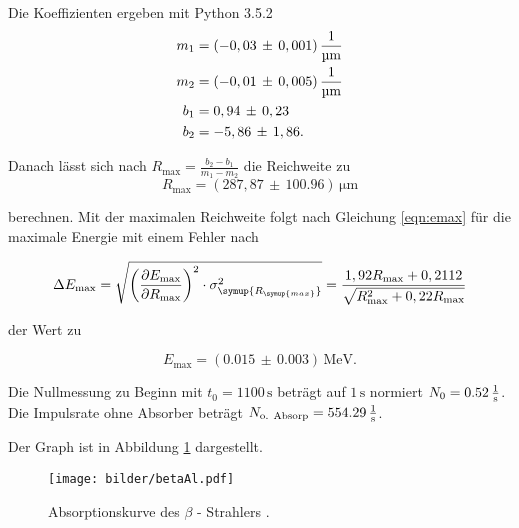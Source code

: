 Die Koeffizienten ergeben mit Python 3.5.2
\begin{align*}
 m_\text{1} &=
(-0,03\,\pm\,0,001)\,\si[per-mode=fraction]{\per\micro\meter}\\
 m_\text{2} &=
(-0,01\,\pm\,0,005)\,\si[per-mode=fraction]{\per\micro\meter} \\
 b_\text{1} &= 0,94\,\pm\,0,23\\
 b_\text{2} &= -5,86\,\pm\,1,86.
\end{align*}

Danach lässt sich nach $R_\text{max} = \frac{b_\text{2} -
b_\text{1}}{m_\text{1} - m_\text{2}}$ die Reichweite zu
\begin{equation}
 R_\text{max} = (287,87\,\pm\,100.96)\,\si{\micro\meter}
\end{equation}

berechnen. Mit der maximalen Reichweite folgt nach Gleichung
\eqref{eqn:emax} für die maximale Energie mit einem Fehler nach

\begin{equation}
 \Delta E_\text{max} = \sqrt{\left(\frac{\partial E_\text{max}}{\partial
R_\text{max}}\right)^2 \cdot \sigma_\symup{R_\symup{max}}^2} =
\frac{1,92 R_\text{max} + 0,2112}{\sqrt{R_\text{max}^2 + 0,22
R_\text{max}}}
\end{equation}

der Wert zu

\begin{equation}
 E_\text{max} = (0.015\,\pm\,0.003)\,\si{\mega\electronvolt}.
\end{equation}
\par\bigskip

Die Nullmessung zu Beginn mit $t_\text{0} = 1100\,\si{\second}$ beträgt
auf $1\,\si{\second}$ normiert $N_\text{0} =
0.52\,\si[per-mode=fraction]{\per\second}$. Die Impulsrate ohne Absorber
beträgt $N_\text{o. Absorp} =
554.29\,\si[per-mode=fraction]{\per\second}$.

Der Graph ist in Abbildung \ref{fig:absorp} dargestellt.

\begin{figure}[H]
 \centering
 \texttt{[image: bilder/betaAl.pdf]}
 \caption{Absorptionskurve des $\beta$ - Strahlers .}
 \label{fig:absorp}
\end{figure}
